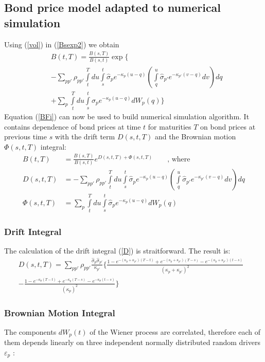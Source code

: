 \documentclass[10pt]{article}
\begin{document}
\subsection{Bond price model adapted to numerical simulation}
Using (\ref{vol}) in (\ref{Bsexp2}) we obtain
\begin{align}
\nonumber &B(t,T)= \frac{B(s,T)}{B(s,t)} \exp \Big\{ \\
\nonumber & -\sum \limits_{pp'} \rho_{pp'} \int \limits_t^T du \int \limits_s^t 
\hat {\sigma}_p e^{-\kappa_p (u-q)}
\left(\int \limits_q^u \hat {\sigma}_{p'}e^{-\kappa_{p'} (v-q)}dv \right)dq  \\
\label{BFi}
&+ \sum \limits_p \int \limits_t^T du \int \limits_s^t \hat {\sigma}_p e^{-\kappa_p (u-q)} dW_p(q) \Big\}
\end{align}
Equation (\ref{BFi}) can now be used to build numerical simulation algorithm. It contains dependence of  bond prices at time $t$  for maturities $T$ on bond prices at previous time $s$ with the drift term $D(s,t,T)$ and the Brownian motion $\Phi (s,t,T)$ integral:
\begin{align}
\label{BBtBT}
B(t,T)&= \frac{B(s,T)}{B(s,t)} e^{D(s,t,T)+\Phi (s,t,T)} \qquad \text{, where} \\
\label{D}
D(s,t,T)&= -\sum \limits_{pp'} \rho_{pp'} \int \limits_t^T du \int \limits_s^t 
\hat {\sigma}_p e^{-\kappa_p (u-q)}
\left(\int \limits_q^u \hat {\sigma}_{p'}e^{-\kappa_{p'} (v-q)}dv \right)dq  \\
\label{Phi}
\Phi (s,t,T)&= \sum \limits_p \int \limits_t^T du \int \limits_s^t \hat {\sigma}_p e^{-\kappa_p (u-q)} dW_p(q) 
\end{align}

\subsubsection{Drift Integral}
The calculation of the drift integral (\ref{D}) is straitforward. The result is:
\begin{align}
\nonumber
D(s,t,T)= \sum \limits_{pp'} \rho_{pp'} \frac{\hat {\sigma}_{p} \hat {\sigma}_{p'}}{\kappa_{p'}}\Big\{ 
\frac{1-e^{-(\kappa_{p}+\kappa_{p'})(T-t)}+e^{-(\kappa_{p}+\kappa_{p'})(T-s)}-e^{-(\kappa_{p}+\kappa_{p'})(t-s)}}{(\kappa_{p}+\kappa_{p'})^2}& \\
\label{DDD}
-\frac{1-e^{-\kappa_{p}(T-t)}+e^{-\kappa_{p}(T-s)}-e^{-\kappa_{p}(t-s)}}{(\kappa_{p})^2} \Big\}&
\end{align}

\subsubsection{Brownian Motion Integral}
The components $dW_p(t)$  of the Wiener process are correlated, therefore each of them  depends linearly on three independent normally distributed random drivers $\varepsilon_p$ :
\end{document}

